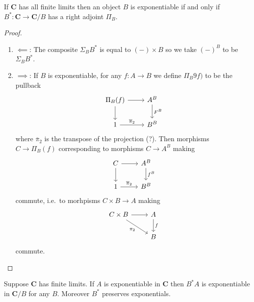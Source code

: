 \documentclass[a4paper]{article}
\renewcommand{\c}[1]{\mathbf{#1}}
\begin{document}
\begin{lemma}
  If \(\c C\) has all finite limits then an object \(B\) is exponentiable if and only if \(B^*: \c C \to \c C/B\) has a right adjoint \(\Pi_B\).
\end{lemma}

\begin{proof}\leavevmode
  \begin{enumerate}
  \item \(\impliedby\): The composite \(\Sigma_B B^*\) is equal to \((-) \times B\) so we take \((-)^B\) to be \(\Sigma_B B^*\).
  \item \(\implies\): If \(B\) is exponentiable, for any \(f: A \to B\) we define \(\Pi_B9f)\) to be the pullback
    \[
      \begin{tikzcd}
        \Pi_B(f) \ar[r] \ar[d] & A^B \ar[d, "F^B"] \\
        1 \ar[r, "\overline \pi_2"] & B^B
      \end{tikzcd}
    \]
    where \(\overline \pi_2\) is the transpose of the projection (?). Then morphisms \(C \to \Pi_B(f)\) corresponding to morphisms \(C \to A^B\) making
    \[
      \begin{tikzcd}
        C \ar[r] \ar[d] & A^B \ar[d, "f^B"] \\
        1 \ar[r, "\overline \pi_2"] & B^B
      \end{tikzcd}
    \]
    commute, i.e.\ to morhpisms \(C \times B \to A\) making
    \[
      \begin{tikzcd}
        C \times B \ar[r] \ar[dr, "\pi_2"'] & A \ar[d, "f"] \\
        & B
      \end{tikzcd}
    \]
    commute.
  \end{enumerate}
\end{proof}

\begin{lemma}
  Suppose \(\c C\) has finite limits. If \(A\) is exponentiable in \(\c C\) then \(B^*A\) is exponentiable in \(\c C/B\) for any \(B\). Moreover \(B^*\) preserves exponentials.
\end{lemma}
\end{document}
